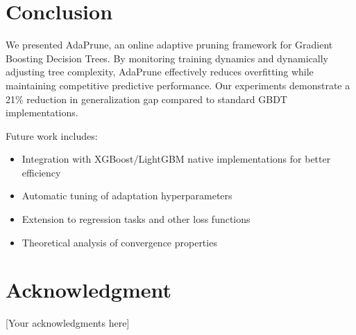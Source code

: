 \documentclass[conference]{IEEEtran}
\begin{document}
\section{Conclusion}

We presented AdaPrune, an online adaptive pruning framework for Gradient Boosting Decision Trees.  By monitoring training dynamics and dynamically adjusting tree complexity, AdaPrune effectively reduces overfitting while maintaining competitive predictive performance.  Our experiments demonstrate a 21\% reduction in generalization gap compared to standard GBDT implementations. 

Future work includes: 
\begin{itemize}
    \item Integration with XGBoost/LightGBM native implementations for better efficiency
    \item Automatic tuning of adaptation hyperparameters
    \item Extension to regression tasks and other loss functions
    \item Theoretical analysis of convergence properties
\end{itemize}

\section*{Acknowledgment}
[Your acknowledgments here]



\end{document}
